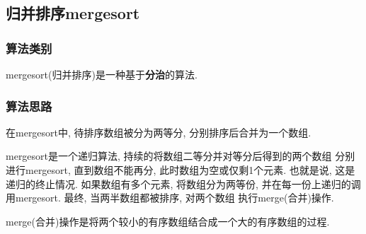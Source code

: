 \subsection{归并排序mergesort}
\subsubsection{算法类别}
mergesort(归并排序)是一种基于\textbf{分治}的算法.

\subsubsection{算法思路}
在mergesort中, 待排序数组被分为两等分, 分别排序后合并为一个数组. \par
mergesort是一个递归算法, 持续的将数组二等分并对等分后得到的两个数组
分别进行mergesort, 直到数组不能再分, 此时数组为空或仅剩1个元素.
也就是说, 这是递归的终止情况. 如果数组有多个元素, 将数组分为两等份,
并在每一份上递归的调用mergesort. 最终, 当两半数组都被排序, 对两个数组
执行merge(合并)操作. \par
merge(合并)操作是将两个较小的有序数组结合成一个大的有序数组的过程.


